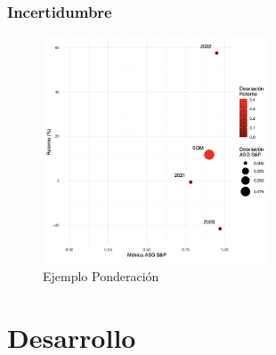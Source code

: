 \documentclass{beamer}
\begin{document}
\begin{frame}
\frametitle{Incertidumbre}
\begin{figure}[h!]
    \centering
        \includegraphics[width=0.6\textwidth]{EjemploPonderacionSQM.png}
    \caption{Ejemplo Ponderación}
\end{figure}
\end{frame}


\section{Desarrollo}
\end{document}
